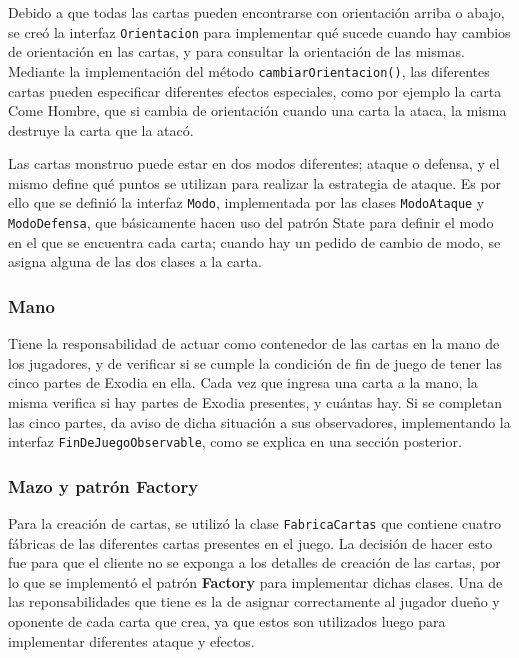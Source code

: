 	Debido a que todas las cartas pueden encontrarse con orientación arriba o abajo, se creó la interfaz \texttt{Orientacion} para implementar qué sucede cuando hay cambios de orientación en las cartas, y para consultar la orientación de las mismas. Mediante la implementación del método \texttt{cambiarOrientacion()}, las diferentes cartas pueden especificar diferentes efectos especiales, como por ejemplo la carta Come Hombre, que si cambia de orientación cuando una carta la ataca, la misma destruye la carta que la atacó.
	
	Las cartas monstruo puede estar en dos modos diferentes; ataque o defensa, y el mismo define qué puntos se utilizan para realizar la estrategia de ataque. Es por ello que se definió la interfaz \texttt{Modo}, implementada por las clases \texttt{ModoAtaque} y \texttt{ModoDefensa}, que básicamente hacen uso del patrón State para definir el modo en el que se encuentra cada carta; cuando hay un pedido de cambio de modo, se asigna alguna de las dos clases a la carta.
	
	\subsubsection{Mano}
	
	Tiene la responsabilidad de actuar como contenedor de las cartas en la mano de los jugadores, y de verificar si se cumple la condición de fin de juego de tener las cinco partes de Exodia en ella. Cada vez que ingresa una carta a la mano, la misma verifica si hay partes de Exodia presentes, y cuántas hay. Si se completan las cinco partes, da aviso de dicha situación a sus observadores, implementando la interfaz \texttt{FinDeJuegoObservable}, como se explica en una sección posterior.
	
	\subsubsection{Mazo y patrón Factory}
	
	Para la creación de cartas, se utilizó la clase \texttt{FabricaCartas} que contiene cuatro fábricas de las diferentes cartas presentes en el juego. La decisión de hacer esto fue para que el cliente no se exponga a los detalles de creación de las cartas, por lo que se implementó el patrón \textbf{Factory} para implementar dichas clases. Una de las reponsabilidades que tiene es la de asignar correctamente al jugador dueño y oponente de cada carta que crea, ya que estos son utilizados luego para implementar diferentes ataque y efectos.
	
